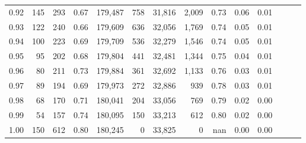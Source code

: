 \begin{tabular}{rrrrrrrrrrrrrr}
0.92 &    145 &  293 &  0.67 &  179,487 &      758 &  31,816 &   2,009 &  0.73 &  0.06 &      0.01 \\
0.93 &    122 &  240 &  0.66 &  179,609 &      636 &  32,056 &   1,769 &  0.74 &  0.05 &      0.01 \\
0.94 &    100 &  223 &  0.69 &  179,709 &      536 &  32,279 &   1,546 &  0.74 &  0.05 &      0.01 \\
0.95 &     95 &  202 &  0.68 &  179,804 &      441 &  32,481 &   1,344 &  0.75 &  0.04 &      0.01 \\
0.96 &     80 &  211 &  0.73 &  179,884 &      361 &  32,692 &   1,133 &  0.76 &  0.03 &      0.01 \\
0.97 &     89 &  194 &  0.69 &  179,973 &      272 &  32,886 &     939 &  0.78 &  0.03 &      0.01 \\
0.98 &     68 &  170 &  0.71 &  180,041 &      204 &  33,056 &     769 &  0.79 &  0.02 &      0.00 \\
0.99 &     54 &  157 &  0.74 &  180,095 &      150 &  33,213 &     612 &  0.80 &  0.02 &      0.00 \\
1.00 &    150 &  612 &  0.80 &  180,245 &        0 &  33,825 &       0 &   nan &  0.00 &      0.00 \\
\bottomrule
\end{tabular}
